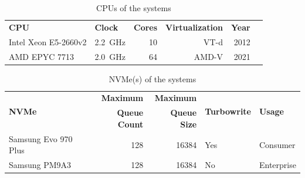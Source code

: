 \begin{table}
    \centering
    \begin{tabular}{llrrrr}
        \multirow{2}{*}{\textbf{CPU}} & \multirow{2}{*}{\textbf{Clock}} & \multirow{2}{*}{\textbf{Cores}} & \multirow{2}{*}{\textbf{Virtualization}} & \multirow{2}{*}{\textbf{Year}}
        \\
                                      &                                 &                                 &                                          &                                \\
        \toprule

        Intel Xeon E5-2660v2          & \qty{2.2}{\giga\Hz}             & 10                              & VT-d                                     & 2012                           \\
        AMD EPYC 7713                 & \qty{2.0}{\giga\Hz}             & 64                              & AMD-V                                    & 2021                           \\

        \bottomrule
    \end{tabular}

    \caption{CPUs of the systems}
    \label{tab:cpus}
\end{table}

\begin{table}
    \centering
    \begin{tabular}{lrrll}
        \multirow{2}{*}{\textbf{NVMe}} & \textbf{Maximum}     & \textbf{Maximum}    & \multirow{2}{*}{\textbf{Turbowrite}} & \multirow{2}{*}{\textbf{Usage}} \\
                                       & \textbf{Queue Count} & \textbf{Queue Size} &                                      &                                 \\
        \toprule

        Samsung Evo 970 Plus           & 128                  & 16384               & Yes                                  & Consumer                        \\
        Samsung PM9A3                  & 128                  & 16384               & No                                   & Enterprise                      \\

        \bottomrule
    \end{tabular}

    \caption{NVMe(s) of the systems}
    \label{tab:nvmes}
\end{table}

